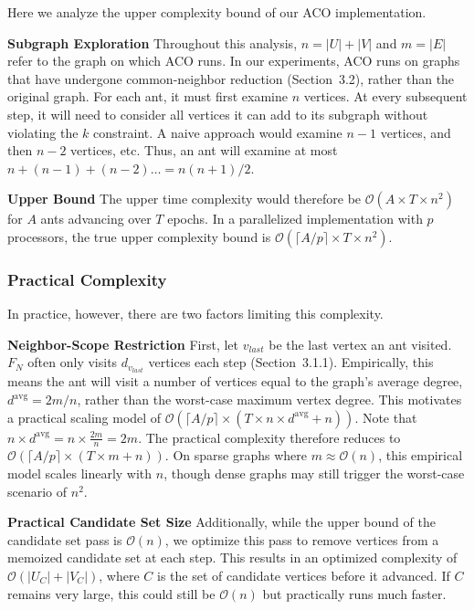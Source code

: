 \documentclass[conference]{IEEEtran}
\begin{document}
Here we analyze the upper complexity bound of our ACO implementation.


\textbf{Subgraph Exploration}
Throughout this analysis, $n = |U| + |V|$ and $m = |E|$ refer to the graph on which ACO runs. In our experiments, ACO runs on graphs that have undergone common-neighbor reduction (Section~3.2), rather than the original graph. For each ant, it must first examine $n$ vertices. At every subsequent step, it will need to consider all vertices it can add to its subgraph without violating the $k$ constraint. A naive approach would examine $n - 1$ vertices, and then $n - 2$ vertices, etc. Thus, an ant will examine at most $n + (n - 1) + (n - 2) \ldots = n(n + 1)/2$.
\


\textbf{Upper Bound} The upper time complexity would therefore be $\mathcal{O}(A \times T \times n^2)$ for $A$ ants advancing over $T$ epochs. In a parallelized implementation with $p$ processors, the true upper complexity bound is $\mathcal{O}(\lceil A / p \rceil \times T \times n^2)$.


\subsubsection{Practical Complexity}


In practice, however, there are two factors limiting this complexity.


\textbf{Neighbor-Scope Restriction} First, let $v_{last}$ be the last vertex an ant visited. $F_N$ often only visits $d_{v_{last}}$ vertices each step (Section~3.1.1). Empirically, this means the ant will visit a number of vertices equal to the graph's average degree, $d^{\mathrm{avg}} = 2m/n$, rather than the worst-case maximum vertex degree. This motivates a practical scaling model of $\mathcal{O}(\lceil A / p \rceil \times (T \times n \times d^{\mathrm{avg}} + n))$. Note that $n \times d^{\mathrm{avg}} = n \times \frac{2m}{n} = 2m$. The practical complexity therefore reduces to $\mathcal{O}(\lceil A / p \rceil \times (T \times m + n))$. On sparse graphs where $m \approx \mathcal{O}(n)$, this empirical model scales linearly with $n$, though dense graphs may still trigger the worst-case scenario of $n^2$.
\


\textbf{Practical Candidate Set Size} Additionally, while the upper bound of the candidate set pass is $\mathcal{O}(n)$, we optimize this pass to remove vertices from a memoized candidate set at each step. This results in an optimized complexity of $\mathcal{O}(|U_C| + |V_C|)$, where $C$ is the set of candidate vertices before it advanced. If $C$ remains very large, this could still be $\mathcal{O}(n)$ but practically runs much faster.
\
\end{document}
